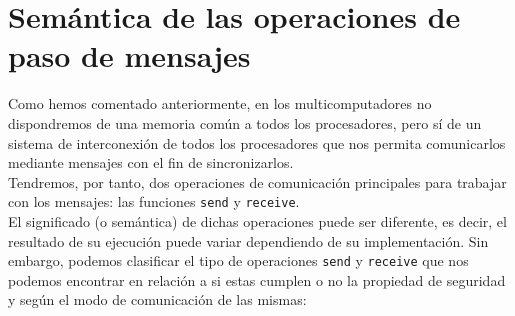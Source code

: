 \section{Semántica de las operaciones de paso de mensajes} %
Como hemos comentado anteriormente, en los multicomputadores no dispondremos de una memoria común a todos los procesadores, pero sí de un sistema de interconexión de todos los procesadores que nos permita comunicarlos mediante mensajes con el fin de sincronizarlos.\\

Tendremos, por tanto, dos operaciones de comunicación principales para trabajar con los mensajes: las funciones \verb|send| y \verb|receive|.\\

El significado (o semántica) de dichas operaciones puede ser diferente, es decir, el resultado de su ejecución puede variar dependiendo de su implementación. Sin embargo, podemos clasificar el tipo de operaciones \verb|send| y \verb|receive| que nos podemos encontrar en relación a si estas cumplen o no la propiedad de seguridad y según el modo de comunicación de las mismas:

